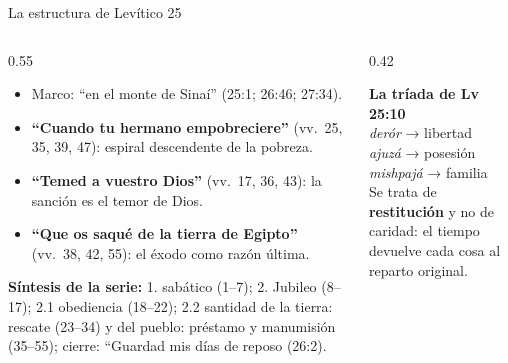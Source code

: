 \documentclass[hyperref={bookmarks=false},aspectratio=169]{beamer}
\newcommand{\destacar}[1]{\textbf{\textcolor{tierraroja}{#1}}}
\begin{document}
\begin{frame}{La estructura de Levítico 25}
\begin{columns}[c,onlytextwidth]
\begin{column}{0.55\textwidth}\small
\begin{itemize}
\item Marco: ``en el monte de Sinaí'' (25:1; 26:46; 27:34).
\item \destacar{``Cuando tu hermano empobreciere''} (vv.~25, 35, 39, 47): espiral descendente de la pobreza.
\item \destacar{``Temed a vuestro Dios''} (vv.~17, 36, 43): la sanción es el temor de Dios.
\item \destacar{``Que os saqué de la tierra de Egipto''} (vv.~38, 42, 55): el éxodo como razón última.
\end{itemize}
\scriptsize\RaggedRight\textbf{Síntesis de la serie:} 1. sabático (1--7); 2. Jubileo (8--17); 2.1 obediencia (18--22); 2.2 santidad de la tierra: rescate (23--34) y del pueblo: préstamo y manumisión (35--55); cierre: ``Guardad mis días de reposo (26:2).
\end{column}
\begin{column}{0.42\textwidth}
\begin{tcolorbox}[colback=papiro,colframe=tierraroja,boxrule=0.8pt,arc=3pt,left=4pt,right=4pt]
\centering\small\textbf{\textcolor{tierraroja}{La tríada de Lv 25:10}}\\[4pt]
\scriptsize \emph{derór} → libertad\\ \emph{ajuzá} → posesión\\ \emph{mishpajá} → familia\\[4pt]
\RaggedRight Se trata de \destacar{restitución} y no de caridad: el tiempo devuelve cada cosa al reparto original.
\end{tcolorbox}
\end{column}
\end{columns}
\end{frame}
\end{document}

